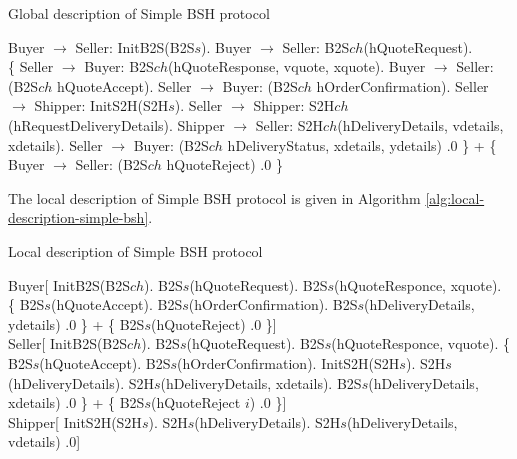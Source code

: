 \begin{algorithm}
\caption{Global description of Simple BSH protocol}
\label{alg:global-description-simple-bsh}
\begin{algorithmic}[1]
    \State Buyer $\rightarrow$ Seller: InitB2S(B2S$s$).
    \State Buyer $\rightarrow$ Seller: B2S$ch$(hQuoteRequest).
    \\
    \State \{ Seller $\rightarrow$ Buyer: B2S$ch$(hQuoteResponse, vquote, xquote).
    \Indstate Buyer $\rightarrow$ Seller: (B2S$ch$ hQuoteAccept).
    \Indstate Seller $\rightarrow$ Buyer: (B2S$ch$ hOrderConfirmation).
    \Indstate Seller $\rightarrow$ Shipper: InitS2H(S2H$s$).
    \Indstate Seller $\rightarrow$ Shipper: S2H$ch$(hRequestDeliveryDetails).
    \Indstate Shipper $\rightarrow$ Seller: S2H$ch$(hDeliveryDetails, vdetails, xdetails).
    \Indstate Seller $\rightarrow$ Buyer: (B2S$ch$ hDeliveryStatus, xdetails, ydetails) .0 \} 
    \State +
    \State \{ Buyer $\rightarrow$ Seller: (B2S$ch$ hQuoteReject) .0 \}
\end{algorithmic}
\end{algorithm}

The local description of Simple BSH protocol is given in Algorithm \ref{alg:local-description-simple-bsh}.

\begin{algorithm}
\caption{Local description of Simple BSH protocol}
\label{alg:local-description-simple-bsh}
\begin{algorithmic}[1]
\State Buyer[ InitB2S(B2S$ch$).
\Indstate B2S$s$(hQuoteRequest).
\Indstate B2S$s$(hQuoteResponce, xquote).
\Indstate[2] \{ B2S$s$(hQuoteAccept).
\Indstate[2] B2S$s$(hOrderConfirmation).
\Indstate[2] B2S$s$(hDeliveryDetails, ydetails) .0 \}
\Indstate[2] +
\Indstate[2] \{ B2S$s$(hQuoteReject) .0 \}]
\\
\State Seller[ InitB2S(B2S$ch$).
\Indstate B2S$s$(hQuoteRequest).
\Indstate B2S$s$(hQuoteResponce, vquote).
\Indstate[2] \{ B2S$s$(hQuoteAccept).
\Indstate[2] B2S$s$(hOrderConfirmation).
\Indstate[2] InitS2H(S2H$s$).
\Indstate[3] S2H$s$(hDeliveryDetails).
\Indstate[3] S2H$s$(hDeliveryDetails, xdetails).
\Indstate[2] B2S$s$(hDeliveryDetails, xdetails) .0 \}
\Indstate[2] +
\Indstate[2] \{ B2S$s$(hQuoteReject $i$) .0 \}]
\\
\State Shipper[ InitS2H(S2H$s$).
\Indstate S2H$s$(hDeliveryDetails).
\Indstate S2H$s$(hDeliveryDetails, vdetails) .0]
\end{algorithmic}
\end{algorithm}


